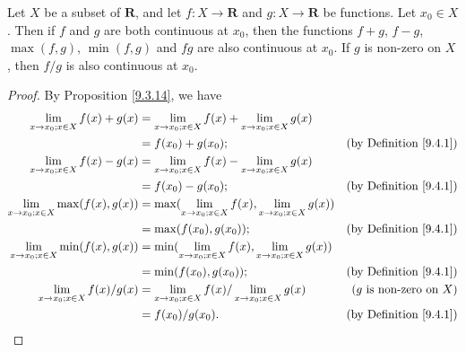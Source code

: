 \begin{proposition}\label{9.4.9}
    Let \(X\) be a subset of \(\mathbf{R}\), and let \(f : X \to \mathbf{R}\) and \(g : X \to \mathbf{R}\) be functions.
    Let \(x_0 \in X\).
    Then if \(f\) and \(g\) are both continuous at \(x_0\), then the functions \(f + g\), \(f - g\), \(\max(f, g)\), \(\min(f, g)\) and \(fg\) are also continuous at \(x_0\).
    If \(g\) is non-zero on \(X\), then \(f / g\) is also continuous at \(x_0\).
\end{proposition}

\begin{proof}
    By Proposition \ref{9.3.14}, we have
    \begin{align*}
        \lim_{x \to x_0 ; x \in X} f(x) + g(x)      & = \lim_{x \to x_0 ; x \in X} f(x) + \lim_{x \to x_0 ; x \in X} g(x)                                            \\
                                                    & = f(x_0) + g(x_0);                                                       & \text{(by Definition \ref{9.4.1})}  \\
        \lim_{x \to x_0 ; x \in X} f(x) - g(x)      & = \lim_{x \to x_0 ; x \in X} f(x) - \lim_{x \to x_0 ; x \in X} g(x)                                            \\
                                                    & = f(x_0) - g(x_0);                                                       & \text{(by Definition \ref{9.4.1})}  \\
        \lim_{x \to x_0 ; x \in X} \max(f(x), g(x)) & = \max(\lim_{x \to x_0 ; x \in X} f(x), \lim_{x \to x_0 ; x \in X} g(x))                                       \\
                                                    & = \max(f(x_0), g(x_0));                                                  & \text{(by Definition \ref{9.4.1})}  \\
        \lim_{x \to x_0 ; x \in X} \min(f(x), g(x)) & = \min(\lim_{x \to x_0 ; x \in X} f(x), \lim_{x \to x_0 ; x \in X} g(x))                                       \\
                                                    & = \min(f(x_0), g(x_0));                                                  & \text{(by Definition \ref{9.4.1})}  \\
        \lim_{x \to x_0 ; x \in X} f(x) / g(x)      & = \lim_{x \to x_0 ; x \in X} f(x) / \lim_{x \to x_0 ; x \in X} g(x)      & \text{(\(g\) is non-zero on \(X\))} \\
                                                    & = f(x_0) / g(x_0).                                                       & \text{(by Definition \ref{9.4.1})}  \\
    \end{align*}
\end{proof}